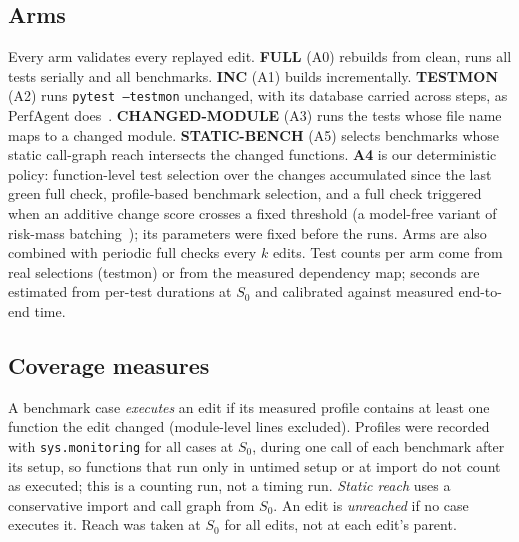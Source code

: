 \subsection{Arms}
Every arm validates every replayed edit.
\textbf{FULL} (A0) rebuilds from clean, runs all tests serially and all benchmarks.
\textbf{INC} (A1) builds incrementally.
\textbf{TESTMON} (A2) runs \texttt{pytest --testmon} unchanged, with its database carried across steps, as PerfAgent does~\cite{deng2026perfagent}.
\textbf{CHANGED-MODULE} (A3) runs the tests whose file name maps to a changed module.
\textbf{STATIC-BENCH} (A5) selects benchmarks whose static call-graph reach intersects the changed functions.
\textbf{A4} is our deterministic policy: function-level test selection over the changes accumulated since the last green full check, profile-based benchmark selection, and a full check triggered when an additive change score crosses a fixed threshold (a model-free variant of risk-mass batching~\cite{sayedsalehi2026riskaware}); its parameters were fixed before the runs.
Arms are also combined with periodic full checks every $k$ edits.
Test counts per arm come from real selections (testmon) or from the measured dependency map; seconds are estimated from per-test durations at $S_0$ and calibrated against measured end-to-end time.

\subsection{Coverage measures}
A benchmark case \emph{executes} an edit if its measured profile contains at least one function the edit changed (module-level lines excluded).
Profiles were recorded with \texttt{sys.monitoring} for all \NxBenchCases{} cases at $S_0$, during one call of each benchmark after its setup, so functions that run only in untimed setup or at import do not count as executed; this is a counting run, not a timing run.
\emph{Static reach} uses a conservative import and call graph from $S_0$.
An edit is \emph{unreached} if no case executes it.
Reach was taken at $S_0$ for all edits, not at each edit's parent.

